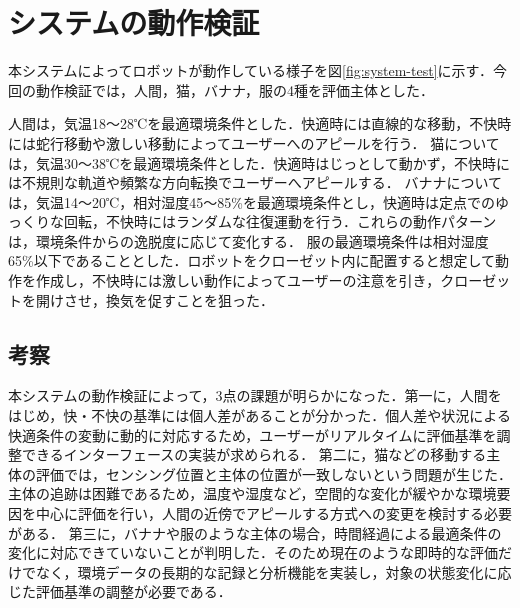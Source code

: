 \documentclass[paper=a4paper,jafontsize=9pt,head_space=15mm,gutter=20mm,
twocolumn,number_of_lines=49, line_length=26zw]{myuarticle}
\begin{document}


\section{システムの動作検証}
本システムによってロボットが動作している様子を図\ref{fig:system-test}に示す．今回の動作検証では，人間，猫，バナナ，服の4種を評価主体とした．

人間は，気温18～28℃を最適環境条件とした．快適時には直線的な移動，不快時には蛇行移動や激しい移動によってユーザーへのアピールを行う．
猫については，気温30～38℃\cite{stellaEnvironmentalAspectsDomestic2016}を最適環境条件とした．快適時はじっとして動かず，不快時には不規則な軌道や頻繁な方向転換でユーザーへアピールする．
バナナについては，気温14～20℃，相対湿度45～85\%を最適環境条件とし，快適時は定点でのゆっくりな回転，不快時にはランダムな往復運動を行う．これらの動作パターンは，環境条件からの逸脱度に応じて変化する．
服の最適環境条件は相対湿度65\%以下であることとした．ロボットをクローゼット内に配置すると想定して動作を作成し，不快時には激しい動作によってユーザーの注意を引き，クローゼットを開けさせ，換気を促すことを狙った．

\subsection{考察}

本システムの動作検証によって，3点の課題が明らかになった．第一に，人間をはじめ，快・不快の基準には個人差があることが分かった．個人差や状況による快適条件の変動に動的に対応するため，ユーザーがリアルタイムに評価基準を調整できるインターフェースの実装が求められる．
第二に，猫などの移動する主体の評価では，センシング位置と主体の位置が一致しないという問題が生じた．主体の追跡は困難であるため，温度や湿度など，空間的な変化が緩やかな環境要因を中心に評価を行い，人間の近傍でアピールする方式への変更を検討する必要がある．
第三に，バナナや服のような主体の場合，時間経過による最適条件の変化に対応できていないことが判明した．そのため現在のような即時的な評価だけでなく，環境データの長期的な記録と分析機能を実装し，対象の状態変化に応じた評価基準の調整が必要である．
\end{document}
